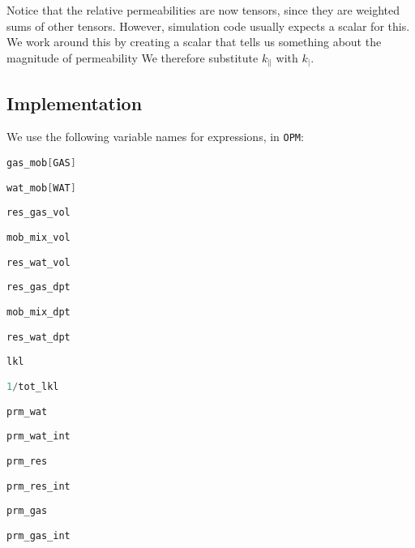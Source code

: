 \documentclass[12pt]{scrartcl}
\newcommand{\wid}[1]{\widthof{\bfseries {#1} \hspace{\labelsep}}}
\newcommand{\OPM}{{\tt OPM}}
\newcommand{\aleft}{\mathopen{}\mathclose\bgroup\left}  %
\newcommand{\aright}{\aftergroup\egroup\right}          %
\newcommand{\binop}[3]{#1\mkern1mu{#2}\mkern1mu #3}     %
\newcommand{\dual}[1]{\binop{1}{-}{#1}}                 %
\newcommand{\ddual}[2]{\binop{\binop{1}{-}{#1}}{-}{#2}} %
\newcommand{\intg}[4]{\int_{#1}^{#2}\!{#3}\,\mathrm{d}{#4}}   %
\newcommand{\inv}[1]{{#1}^{-1}}                               %
\newcommand{\latr}[1]{{#1}_{\|}}                              %
\newcommand{\magn}[1]{{#1}_|}                                 %
\newcommand{\por}{\phi}     %
\newcommand{\sat}{s}        %
\newcommand{\sr}[1]{\sat_{#1,r}}    %
\newcommand{\Prm}{K}        %
\newcommand{\prm}{k}        %
\newcommand{\rlp}[1]{k_{r,#1}}  %
\newcommand{\Lev}{\zeta}    %
\newcommand{\Mob}{M}        %
\newcommand{\dph}{z}        %
\newcommand{\nap}{c}        %
\newcommand{\wet}{b}        %
\newcommand{\h}{h}          %
\newcommand{\krnwr}{c}      %
\newcommand{\krwnr}{b}      %
\newcommand{\snr}{\sr{\nap}}    %
\newcommand{\swr}{\sr{\wet}}    %
\newcommand{\LevM}{\Lev_\Mob}
\newcommand{\rlpn}{\rlp{\nap}}
\newcommand{\rlpw}{\rlp{\wet}}
\begin{document}
Notice that the relative permeabilities are now tensors, since they are weighted sums of other tensors. However, simulation code usually expects a scalar for this. We work around this by creating a scalar that tells us something about the magnitude of permeability We therefore substitute \( \latr{ \prm } \) with \( \magn{ \prm } \).

\subsection{Implementation}

We use the following variable names for expressions, in \OPM:

\begin{description}[labelwidth=\wid{\( \intg{ \h }{ \LevM }{ \por \left( \ddual{ \swr }{ \snr } \right) }{ \dph } \)}]
\item[ \( \rlpn \aleft( \dual{\swr} \aright) = \krnwr \) ] \lstinline[language=C++]!gas_mob[GAS]!
\item[ \( \rlpw \aleft( \snr \aright) = \krwnr \) ] \lstinline[language=C++]!wat_mob[WAT]!
\item[ \( \por \snr \) ] \lstinline[language=C++]!res_gas_vol!
\item[ \( \por \left( \ddual{ \swr }{ \snr } \right) \) ] \lstinline[language=C++]!mob_mix_vol!
\item[ \( \por \left( \dual{ \swr } \right) \) ] \lstinline[language=C++]!res_wat_vol!
\item[ \( \intg{ \h }{ \LevM }{ \por \snr }{ \dph } \) ] \lstinline[language=C++]!res_gas_dpt!
\item[ \( \intg{ \h }{ \LevM }{ \por \left( \ddual{ \swr }{ \snr } \right) }{ \dph } \) ] \lstinline[language=C++]!mob_mix_dpt!
\item[ \( \intg{ \h }{ \LevM }{ \por \left( \dual{ \swr } \right) }{ \dph } \) ] \lstinline[language=C++]!res_wat_dpt!
\item[ \( \magn{ \prm } \) ] \lstinline[language=C++]!lkl!
\item[ \( \inv{ \Prm } \) ] \lstinline[language=C++]!1/tot_lkl!
\item[ \( \inv{ \Prm } \latr{ \prm } \cdot \left( \dual{ \krwnr } \right) \) ] \lstinline[language=C++]!prm_wat!
\item[ \( \inv{ \Prm } \intg{ \h }{ \LevM }{ \latr{ \prm } \cdot \left( \dual{ \krwnr } \right) }{ \dph } \) ] \lstinline[language=C++]!prm_wat_int!
\item[ \( \inv{ \Prm } \latr{ \prm } \cdot \krwnr \) ] \lstinline[language=C++]!prm_res!
\item[ \( \inv{ \Prm } \intg{ \h }{ \LevM }{ \latr{ \prm } \cdot \krwnr }{ \dph } \) ] \lstinline[language=C++]!prm_res_int!
\item[ \( \inv{ \Prm } \latr{ \prm } \cdot \krnwr \) ] \lstinline[language=C++]!prm_gas!
\item[ \( \inv{ \Prm } \intg{ \h }{ \LevM }{ \latr{ \prm } \cdot \krnwr }{ \dph } \) ] \lstinline[language=C++]!prm_gas_int!
\end{description}
\end{document}
